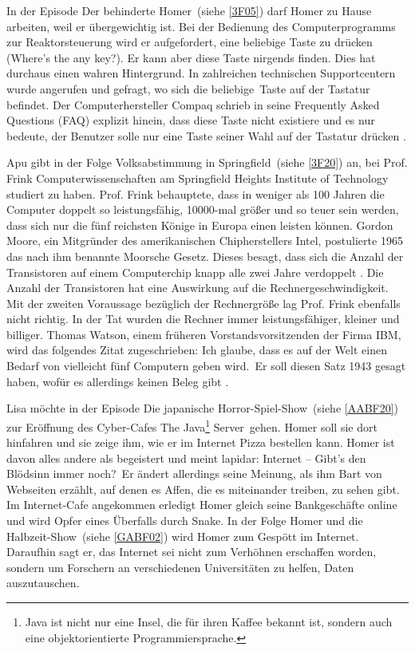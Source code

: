 \begin{appendix}
In der Episode \glqq Der behinderte Homer\grqq\ (siehe \ref{3F05}) darf Homer zu Hause arbeiten, weil er übergewichtig ist. Bei der Bedienung des Computerprogramms zur Reaktorsteuerung wird er aufgefordert, eine beliebige Taste zu drücken (\grqq Where's the any key?\grqq ). Er kann aber diese Taste nirgends finden. Dies hat durchaus einen wahren Hintergrund. In zahlreichen technischen Supportcentern wurde angerufen und gefragt, wo sich die \glqq beliebige\grqq\ Taste auf der Tastatur befindet. Der Computerhersteller Compaq schrieb in seine Frequently Asked Questions (FAQ) explizit hinein, dass diese Taste nicht existiere und es nur bedeute, der Benutzer solle nur eine Taste seiner Wahl auf der Tastatur drücken \cite{CompaqFAQ}.

Apu gibt in der Folge \glqq Volksabstimmung in Springfield\grqq\ (siehe \ref{3F20}) an, bei Prof. Frink Computerwissenschaften am Springfield Heights Institute of Technology studiert zu haben. Prof. Frink behauptete, dass in weniger als 100 Jahren die Computer doppelt so leistungsfähig, 10000-mal größer und so teuer sein werden, dass sich nur die fünf reichsten Könige in Europa einen leisten können. Gordon Moore, ein Mitgründer des amerikanischen Chipherstellers Intel, postulierte 1965 das nach ihm benannte \glqq Moorsche Gesetz\grqq . Dieses besagt, dass sich die Anzahl der Transistoren auf einem Computerchip knapp alle zwei Jahre verdoppelt \cite{MooresLaw}. Die Anzahl der Transistoren hat eine Auswirkung auf die Rechnergeschwindigkeit. Mit der zweiten Voraussage bezüglich der Rechnergröße lag Prof. Frink ebenfalls nicht richtig. In der Tat wurden die Rechner immer leistungsfähiger, kleiner und billiger. Thomas Watson, einem früheren Vorstandsvorsitzenden der Firma IBM, wird das folgendes Zitat zugeschrieben: \glqq Ich glaube, dass es auf der Welt einen Bedarf von vielleicht fünf Computern geben wird.\grqq\ Er soll diesen Satz 1943 gesagt haben, wofür es allerdings keinen Beleg gibt \cite{ThomasJWatson}.

Lisa möchte in der Episode \glqq Die japanische Horror-Spiel-Show\grqq\ (siehe \ref{AABF20}) zur Eröffnung des Cyber-Cafes \glqq The Java\footnote{Java ist nicht nur eine Insel, die für ihren Kaffee bekannt ist, sondern auch eine objektorientierte Programmiersprache.} Server\grqq\ gehen. Homer soll sie dort hinfahren und sie zeige ihm, wie er im Internet Pizza bestellen kann. Homer ist davon alles andere als begeistert und meint lapidar: \glqq Internet -- Gibt's den Blödsinn immer noch?\grqq\ Er ändert allerdings seine Meinung, als ihm Bart von Webseiten erzählt, auf denen es Affen, die es miteinander treiben, zu sehen gibt. Im Internet-Cafe angekommen erledigt Homer gleich seine Bankgeschäfte online und wird Opfer eines Überfalls durch Snake. In der Folge \glqq Homer und die Halbzeit-Show\grqq\ (siehe \ref{GABF02}) wird Homer zum Gespött im Internet. Daraufhin sagt er, das Internet sei nicht zum Verhöhnen erschaffen worden, sondern um Forschern an verschiedenen Universitäten zu helfen, Daten auszutauschen.


\end{appendix}
